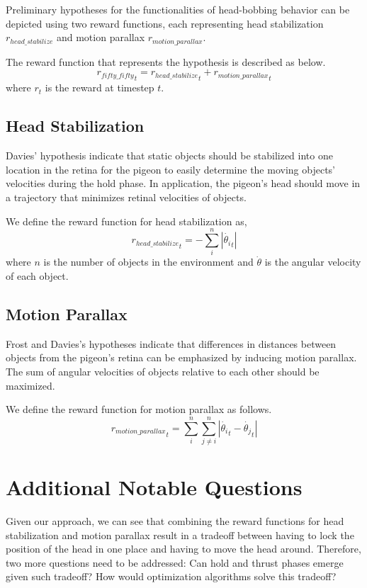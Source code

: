   Preliminary hypotheses for the functionalities of head-bobbing behavior can be depicted using two reward functions, each representing head stabilization ${r_{head\_stabilize}}$ and motion parallax ${r_{motion\_parallax}}$.

  The reward function that represents the hypothesis is described as below.
  \begin{equation}
    {r_{fifty\_fifty}}_t = {r_{head\_stabilize}}_t + {r_{motion\_parallax}}_t
  \end{equation}
  where $r_t$ is the reward at timestep $t$.

  \subsection{Head Stabilization}
    Davies' hypothesis indicate that static objects should be stabilized into one location in the retina for the pigeon to easily determine the moving objects' velocities during the hold phase. In application, the pigeon's head should move in a trajectory that minimizes retinal velocities of objects.

    We define the reward function for head stabilization as,
    \begin{equation}
      {r_{head\_stabilize}}_t = - \sum_i^n |\dot {\theta_i}_t|
    \end{equation}
    where $n$ is the number of objects in the environment and $\dot \theta$ is the angular velocity of each object.

  \subsection{Motion Parallax}
    Frost and Davies's hypotheses indicate that differences in distances between objects from the pigeon's retina can be emphasized by inducing motion parallax.
    The sum of angular velocities of objects relative to each other should be maximized.

    We define the reward function for motion parallax as follows.
    \begin{equation}
      {r_{motion\_parallax}}_t = \sum_i^n \sum_{j \ne i}^n |\dot {\theta_i}_t - \dot {\theta_j}_t|
    \end{equation}


\section{Additional Notable Questions}
  Given our approach, we can see that combining the reward functions for head stabilization and motion parallax result in a tradeoff between having to lock the position of the head in one place and having to move the head around. Therefore, two more questions need to be addressed: Can hold and thrust phases emerge given such tradeoff? How would optimization algorithms solve this tradeoff?

